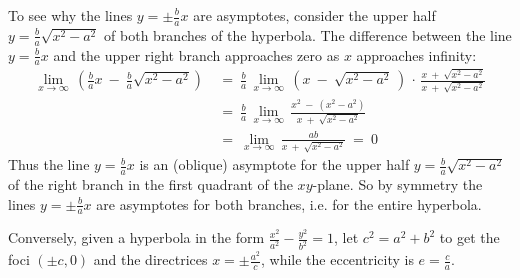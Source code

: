 To see why the lines $y=\pm \frac{b}{a}x$ are asymptotes, consider the upper
half $y=\frac{b}{a}\sqrt{x^2 - a^2}$ of both branches of the hyperbola. The
difference between the line $y=\frac{b}{a}x$ and the upper right branch
approaches zero as $x$ approaches infinity:
\begin{align*}
\lim_{x \to \infty} \,\left(\frac{b}{a}x ~-~ \frac{b}{a}\sqrt{x^2 - a^2}\right) ~&=~
 \frac{b}{a}\,\lim_{x \to \infty} \,\left(x ~-~ \sqrt{x^2 - a^2}\,\right) \,\cdot\,
 \frac{x ~+~ \sqrt{x^2 - a^2}}{x ~+~ \sqrt{x^2 - a^2}}\\[4pt]
&=~ \frac{b}{a}\,\lim_{x \to \infty} \,\frac{x^2 ~-~ (x^2 - a^2)}{x ~+~ \sqrt{x^2 - a^2}}\\[4pt]
&=~ \lim_{x \to \infty} \,\frac{ab}{x ~+~ \sqrt{x^2 - a^2}} ~=~ 0
\end{align*}
Thus the line $y=\frac{b}{a}x$ is an (oblique) asymptote for the upper half
$y=\frac{b}{a}\sqrt{x^2 - a^2}$ of the right branch in the first quadrant of
the $xy$-plane. So by symmetry the lines $y=\pm \frac{b}{a}x$ are asymptotes for
both branches, i.e. for the entire hyperbola.

Conversely, given a hyperbola in the form
$\frac{x^2}{a^2} - \frac{y^2}{b^2} = 1$, let $c^2=a^2+b^2$ to get the foci
$(\pm c,0)$ and the directrices $x=\pm\frac{a^2}{c}$, while the eccentricity is
$e = \frac{c}{a}$.

